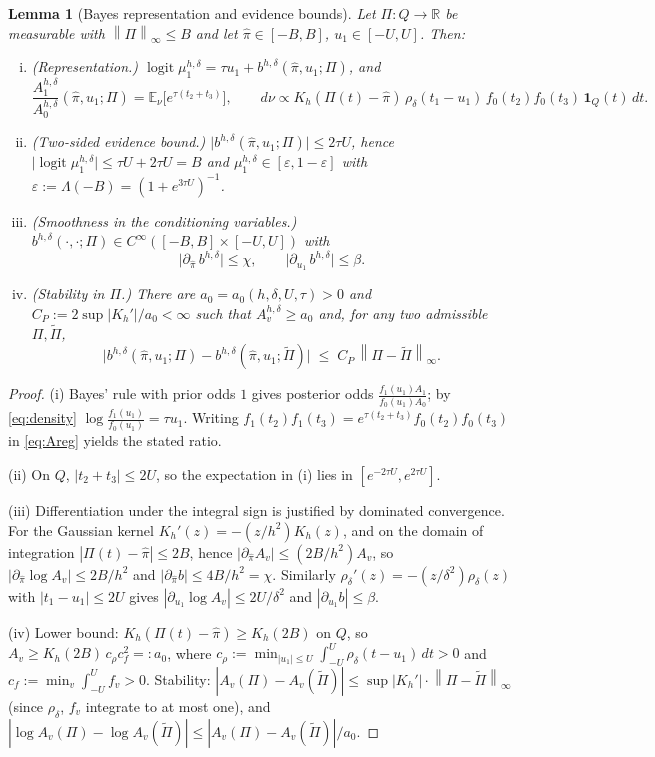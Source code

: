 \documentclass[11pt]{article}
\newtheorem{lemma}{Lemma}
\theoremstyle{definition}
\newcommand{\R}{\mathbb{R}}
\newcommand{\E}{\mathbb{E}}
\newcommand{\Lam}{\Lambda}
\newcommand{\norm}[1]{\left\lVert #1 \right\rVert}
\begin{document}
\begin{lemma}[Bayes representation and evidence bounds]\label{lem:bayes}
Let $\Pi:Q\to\R$ be measurable with $\norm{\Pi}_\infty\le B$ and let
$\hat\pi\in[-B,B]$, $u_1\in[-U,U]$. Then:
\begin{enumerate}[(i)]
\item (Representation.) $\operatorname{logit}\mu^{h,\delta}_1
=\tau u_1+b^{h,\delta}(\hat\pi,u_1;\Pi)$, and
\[
\frac{A^{h,\delta}_1}{A^{h,\delta}_0}(\hat\pi,u_1;\Pi)
=\E_{\nu}\big[e^{\tau(t_2+t_3)}\big],
\qquad
d\nu\propto K_h(\Pi(t)-\hat\pi)\,\rho_\delta(t_1-u_1)\,
f_0(t_2)f_0(t_3)\,\mathbf 1_Q(t)\,dt .
\]
\item (Two-sided evidence bound.)
$\big|b^{h,\delta}(\hat\pi,u_1;\Pi)\big|\le 2\tau U$, hence
$\big|\operatorname{logit}\mu^{h,\delta}_1\big|\le \tau U+2\tau U=B$ and
$\mu^{h,\delta}_1\in[\varepsilon,1-\varepsilon]$ with
$\varepsilon:=\Lam(-B)=(1+e^{3\tau U})^{-1}$.
\item (Smoothness in the conditioning variables.)
$b^{h,\delta}(\cdot,\cdot;\Pi)\in C^\infty([-B,B]\times[-U,U])$ with
\[
\Big|\partial_{\hat\pi}\,b^{h,\delta}\Big|\le \chi,
\qquad
\Big|\partial_{u_1}\,b^{h,\delta}\Big|\le \beta .
\]
\item (Stability in $\Pi$.) There are $a_0=a_0(h,\delta,U,\tau)>0$ and
$C_P:=2\sup|K_h'|/a_0<\infty$ such that
$A^{h,\delta}_v\ge a_0$ and, for any two admissible $\Pi,\tilde\Pi$,
\[
\big|b^{h,\delta}(\hat\pi,u_1;\Pi)-b^{h,\delta}(\hat\pi,u_1;\tilde\Pi)\big|
\;\le\;C_P\,\norm{\Pi-\tilde\Pi}_\infty .
\]
\end{enumerate}
\end{lemma}

\begin{proof}
(i) Bayes' rule with prior odds $1$ gives posterior odds
$\frac{f_1(u_1)A_1}{f_0(u_1)A_0}$; by \eqref{eq:density}
$\log\frac{f_1(u_1)}{f_0(u_1)}=\tau u_1$. Writing
$f_1(t_2)f_1(t_3)=e^{\tau(t_2+t_3)}f_0(t_2)f_0(t_3)$ in \eqref{eq:Areg}
yields the stated ratio.

(ii) On $Q$, $|t_2+t_3|\le 2U$, so the expectation in (i) lies in
$[e^{-2\tau U},e^{2\tau U}]$.

(iii) Differentiation under the integral sign is justified by dominated
convergence. For the Gaussian kernel $K_h'(z)=-(z/h^2)K_h(z)$, and on the
domain of integration $|\Pi(t)-\hat\pi|\le 2B$, hence
$|\partial_{\hat\pi}A_v|\le(2B/h^2)A_v$, so
$|\partial_{\hat\pi}\log A_v|\le 2B/h^2$ and
$|\partial_{\hat\pi}b|\le 4B/h^2=\chi$. Similarly
$\rho_\delta'(z)=-(z/\delta^2)\rho_\delta(z)$ with $|t_1-u_1|\le 2U$ gives
$|\partial_{u_1}\log A_v|\le 2U/\delta^2$ and $|\partial_{u_1}b|\le\beta$.

(iv) Lower bound: $K_h(\Pi(t)-\hat\pi)\ge K_h(2B)$ on $Q$, so
$A_v\ge K_h(2B)\,c_\rho c_f^2=:a_0$, where
$c_\rho:=\min_{|u_1|\le U}\int_{-U}^{U}\rho_\delta(t-u_1)\,dt>0$ and
$c_f:=\min_v\int_{-U}^{U}f_v>0$. Stability:
$|A_v(\Pi)-A_v(\tilde\Pi)|\le\sup|K_h'|\cdot\norm{\Pi-\tilde\Pi}_\infty$
(since $\rho_\delta$, $f_v$ integrate to at most one), and
$|\log A_v(\Pi)-\log A_v(\tilde\Pi)|\le|A_v(\Pi)-A_v(\tilde\Pi)|/a_0$.
\end{proof}
\end{document}
